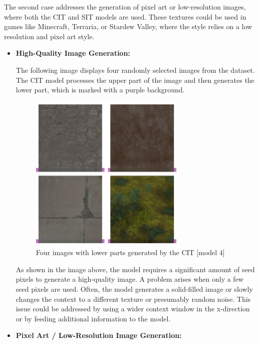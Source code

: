     The second case addresses the generation of pixel art or low-resolution images, where both the CIT and SIT models are used. These textures could be used in games like Minecraft, Terraria, or Stardew Valley, where the style relies on a low resolution and pixel art style.
    
    \begin{itemize}
        \item \textbf{High-Quality Image Generation:}
    
            The following image displays four randomly selected images from the dataset. The CIT model processes the upper part of the image and then generates the lower part, which is marked with a purple background.
    
            \begin{figure}[H]
                \centering
                \includegraphics[width=0.7\textwidth]{imgs/GenExample1.png}
                \caption{Four images with lower parts generated by the CIT [model 4]}
                \label{fig:GenExample1}
            \end{figure}
    
            As shown in the image above, the model requires a significant amount of seed pixels to generate a high-quality image. A problem arises when only a few seed pixels are used. Often, the model generates a solid-filled image or slowly changes the context to a different texture or presumably random noise. This issue could be addressed by using a wider context window in the x-direction or by feeding additional information to the model.
    
        \item \textbf{Pixel Art / Low-Resolution Image Generation:}
        

\end{itemize}
